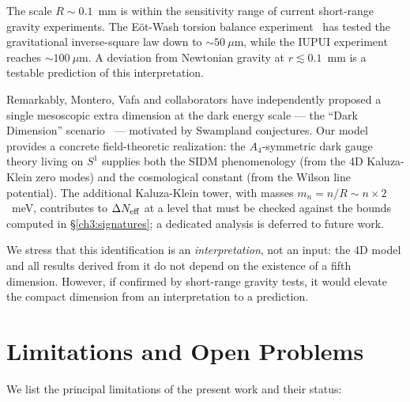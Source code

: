 The scale $R \sim 0.1$~mm is within the sensitivity range of current
short-range gravity experiments. The E\"ot-Wash torsion balance
experiment~\cite{Adelberger2003} has tested the gravitational
inverse-square law down to $\sim 50~\mu$m, while the IUPUI experiment
reaches $\sim 100~\mu$m. A deviation from Newtonian gravity at
$r \lesssim 0.1$~mm is a testable prediction of this interpretation.

Remarkably, Montero, Vafa and collaborators have independently
proposed a single mesoscopic extra dimension at the dark energy
scale — the ``Dark Dimension'' scenario~\cite{Montero2022} —
motivated by Swampland conjectures. Our model provides a concrete
field-theoretic realization: the $A_4$-symmetric dark gauge theory
living on $S^1$ supplies both the SIDM phenomenology (from the 4D
Kaluza-Klein zero modes) and the cosmological constant (from the
Wilson line potential). The additional Kaluza-Klein tower, with
masses $m_n = n/R \sim n \times 2$~meV, contributes to $\Delta N_{\rm eff}$
at a level that must be checked against the bounds computed in
§\ref{ch3:signatures}; a dedicated analysis is deferred to future work.

We stress that this identification is an \emph{interpretation}, not
an input: the 4D model and all results derived from it do not depend
on the existence of a fifth dimension. However, if confirmed by
short-range gravity tests, it would elevate the compact dimension
from an interpretation to a prediction.


\section{Limitations and Open Problems}
\label{disc:limitations}

We list the principal limitations of the present work and their status:

